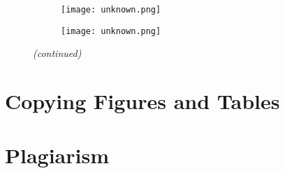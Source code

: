 \begin{figure}[htbp]
\ContinuedFloat
    \centering
    \begin{subfigure}[t]{\textwidth}
          \begin{minipage}[t]{0.49\linewidth}
            \centering
            \texttt{[image: unknown.png]}
          \end{minipage}
          \hspace{0.02\linewidth}
          \begin{minipage}[t]{0.49\linewidth}
            \centering
            \texttt{[image: unknown.png]}
          \end{minipage}
        \caption{}\label{fig:add_label}
    \end{subfigure}
    \captionsetup{list=no}
    \caption{\emph{(continued)}}
\end{figure}

\section{Copying Figures and Tables}


\section{Plagiarism}

